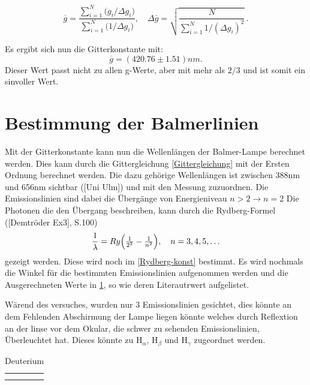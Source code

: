 \begin{equation}
  \overline{g}
  = \frac{\sum_{i=1}^{N} \bigl(g_i/\Delta g_i\bigr)}
         {\sum_{i=1}^{N} \bigl(1/\Delta g_i\bigr)},
  \quad
  \Delta\overline{g}
  = \sqrt{\frac{N}{\sum_{i=1}^{N} 1/(\Delta g_i)^{2}}}\,.
\end{equation}

Es ergibt sich nun die Gitterkonstante mit:
\begin{equation}
    \overline{g} = (420.76 \pm 1.51) nm.
    \label{gitterkon}
\end{equation}
Dieser Wert passt nicht zu allen g-Werte, aber mit mehr als $2/3$ und ist somit ein sinvoller Wert. 

\section{Bestimmung der Balmerlinien}

Mit der Gitterkonstante kann nun die Wellenlängen der Balmer-Lampe berechnet werden. 
Dies kann durch die Gittergleichung \ref{Gittergleichung} mit der Ersten Ordnung berechnet werden.
Die dazu gehörige Wellenlängen ist zwischen 388nm und 656nm sichtbar ([Uni Ulm]) und mit den Messung zuzuordnen.
Die Emissionslinien sind dabei die Übergänge von Energieniveau $n > 2 \xrightarrow{} n = 2$ 
Die Photonen die den Übergang beschreiben, kann durch die Rydberg-Formel ([Demtröder Ex3], S.100) 
\begin{equation}
  \frac{1}{\lambda}
  = Ry\Bigl(\tfrac{1}{2^{2}} - \tfrac{1}{n^{2}}\Bigr),
  \quad n=3,4,5,\dots
  \label{Rydberg-Formel}
\end{equation}
gezeigt werden.
Diese wird noch im \cref{Rydberg-konst} bestimmt. 
Es wird nochmals die Winkel für die bestimmten Emissionslinien aufgenommen werden und die Ausgerechneten Werte in \cref{tab: gesehenes deut}, so wie deren Literautrwert aufgelistet. 

Wärend des versuches, wurden nur 3 Emissionslinien gesichtet, dies könnte an dem Fehlenden Abschirmung der Lampe liegen könnte welches durch Reflextion an der linse vor dem Okular, die schwer zu sehenden Emissionslinien, Überleuchtet hat. %
Dieses könnte zu H$_\alpha$, H$_\beta$ und H$_\gamma$ zugeordnet werden.

\begin{table}[htbp]
    \centering
    \begin{tabular}{c|c}
         &  \\
         & 
    \end{tabular}
    \caption{Deuterium}
    \label{tab: gesehenes deut}
\end{table}


